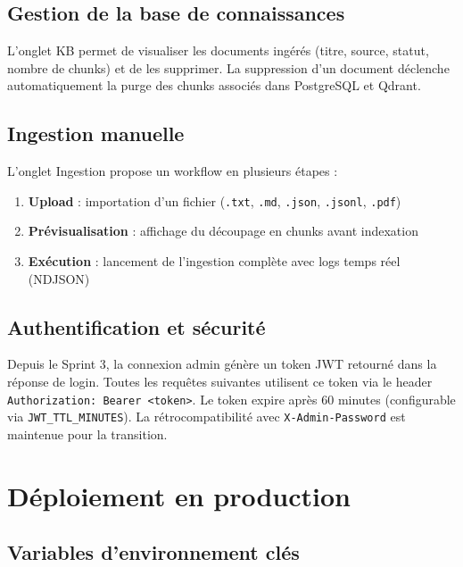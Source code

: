 \documentclass[12pt,a4paper]{report}
\begin{document}
\subsection{Gestion de la base de connaissances}

L'onglet KB permet de visualiser les documents ingérés (titre, source, statut, nombre
de chunks) et de les supprimer. La suppression d'un document déclenche automatiquement
la purge des chunks associés dans PostgreSQL et Qdrant.

\subsection{Ingestion manuelle}

L'onglet Ingestion propose un workflow en plusieurs étapes :
\begin{enumerate}
  \item \textbf{Upload} : importation d'un fichier (\texttt{.txt}, \texttt{.md},
  \texttt{.json}, \texttt{.jsonl}, \texttt{.pdf})
  \item \textbf{Prévisualisation} : affichage du découpage en chunks avant indexation
  \item \textbf{Exécution} : lancement de l'ingestion complète avec logs temps réel (NDJSON)
\end{enumerate}

\subsection{Authentification et sécurité}

Depuis le Sprint 3, la connexion admin génère un token JWT retourné dans la réponse
de login. Toutes les requêtes suivantes utilisent ce token via le header
\texttt{Authorization: Bearer <token>}. Le token expire après 60 minutes (configurable
via \texttt{JWT\_TTL\_MINUTES}). La rétrocompatibilité avec \texttt{X-Admin-Password}
est maintenue pour la transition.

\section{Déploiement en production}

\subsection{Variables d'environnement clés}
\end{document}
